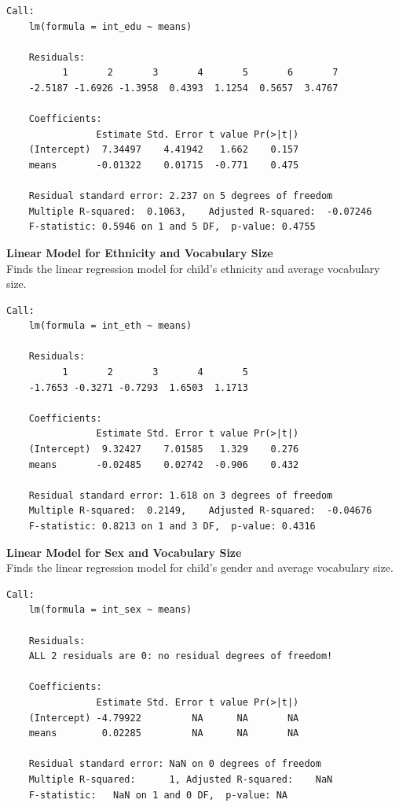 \documentclass[11pt]{article}  %
\begin{document}
\begin{lstlisting}[basicstyle=\small]
    Call:
    lm(formula = int_edu ~ means)
    
    Residuals:
          1       2       3       4       5       6       7 
    -2.5187 -1.6926 -1.3958  0.4393  1.1254  0.5657  3.4767 
    
    Coefficients:
                Estimate Std. Error t value Pr(>|t|)
    (Intercept)  7.34497    4.41942   1.662    0.157
    means       -0.01322    0.01715  -0.771    0.475
    
    Residual standard error: 2.237 on 5 degrees of freedom
    Multiple R-squared:  0.1063,	Adjusted R-squared:  -0.07246 
    F-statistic: 0.5946 on 1 and 5 DF,  p-value: 0.4755
\end{lstlisting}
\textbf{Linear Model for Ethnicity and Vocabulary Size}\\
Finds the linear regression model for child's ethnicity and  average vocabulary size.
\label{sec:EthMVlm}
\begin{lstlisting}[basicstyle=\small]
    Call:
    lm(formula = int_eth ~ means)
    
    Residuals:
          1       2       3       4       5 
    -1.7653 -0.3271 -0.7293  1.6503  1.1713 
    
    Coefficients:
                Estimate Std. Error t value Pr(>|t|)
    (Intercept)  9.32427    7.01585   1.329    0.276
    means       -0.02485    0.02742  -0.906    0.432
    
    Residual standard error: 1.618 on 3 degrees of freedom
    Multiple R-squared:  0.2149,	Adjusted R-squared:  -0.04676 
    F-statistic: 0.8213 on 1 and 3 DF,  p-value: 0.4316
\end{lstlisting}
\textbf{Linear Model for Sex and Vocabulary Size}\\
Finds the linear regression model for child's gender and  average vocabulary size.
\label{sec:EthMVlm}
\begin{lstlisting}[basicstyle=\small]
    Call:
    lm(formula = int_sex ~ means)
    
    Residuals:
    ALL 2 residuals are 0: no residual degrees of freedom!
    
    Coefficients:
                Estimate Std. Error t value Pr(>|t|)
    (Intercept) -4.79922         NA      NA       NA
    means        0.02285         NA      NA       NA
    
    Residual standard error: NaN on 0 degrees of freedom
    Multiple R-squared:      1,	Adjusted R-squared:    NaN 
    F-statistic:   NaN on 1 and 0 DF,  p-value: NA
\end{lstlisting}
\end{document}
